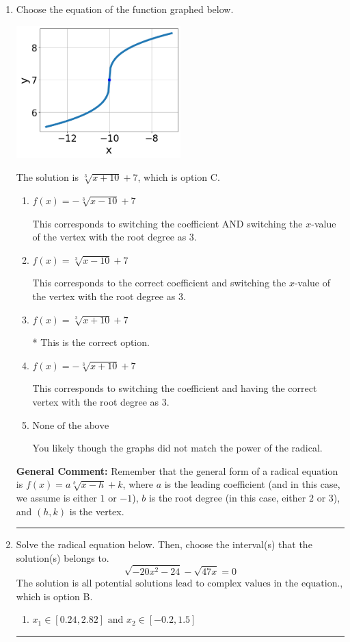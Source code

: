 \documentclass{extbook}[14pt]
\newcommand{\litem}[1]{\item #1

\rule{\textwidth}{0.4pt}}
\begin{document}
\begin{enumerate}\litem{
Choose the equation of the function graphed below.

\begin{center}
    \includegraphics[width=0.5\textwidth]{../Figures/radicalGraphToEquationC.png}
\end{center}


The solution is \( \sqrt[3]{x + 10} + 7 \), which is option C.\begin{enumerate}[label=\Alph*.]
\item \( f(x) = - \sqrt[3]{x - 10} + 7 \)

This corresponds to switching the coefficient AND switching the $x$-value of the vertex with the root degree as $3$.
\item \( f(x) = \sqrt[3]{x - 10} + 7 \)

This corresponds to the correct coefficient and switching the $x$-value of the vertex with the root degree as $3$.
\item \( f(x) = \sqrt[3]{x + 10} + 7 \)

* This is the correct option.
\item \( f(x) = - \sqrt[3]{x + 10} + 7 \)

This corresponds to switching the coefficient and having the correct vertex with the root degree as $3$.
\item \( \text{None of the above} \)

You likely though the graphs did not match the power of the radical.
\end{enumerate}

\textbf{General Comment:} Remember that the general form of a radical equation is $ f(x) = a \sqrt[b]{x - h} + k$, where $a$ is the leading coefficient (and in this case, we assume is either $1$ or $-1$), $b$ is the root degree (in this case, either $2$ or $3$), and $(h, k)$ is the vertex.
}
\litem{
Solve the radical equation below. Then, choose the interval(s) that the solution(s) belongs to.
\[ \sqrt{-20 x^2 - 24} - \sqrt{47 x} = 0 \]The solution is \( \text{all potential solutions lead to complex values in the equation.} \), which is option B.\begin{enumerate}[label=\Alph*.]
\item \( x_1 \in [0.24, 2.82] \text{ and } x_2 \in [-0.2,1.5] \)


\end{enumerate}}
\end{enumerate}
\end{document}
